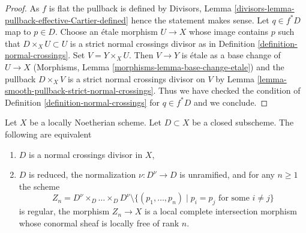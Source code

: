 \begin{proof}
As $f$ is flat the pullback is defined by
Divisors, Lemma \ref{divisors-lemma-pullback-effective-Cartier-defined}
hence the statement makes sense.
Let $q \in f^*D$ map to $p \in D$.
Choose an \'etale morphism $U \to X$ whose image contains $p$
such that $D \times_X U \subset U$ is a strict normal crossings
divisor as in Definition \ref{definition-normal-crossings}.
Set $V = Y \times_X U$. Then $V \to Y$ is \'etale as a base
change of $U \to X$
(Morphisms, Lemma \ref{morphisms-lemma-base-change-etale})
and the pullback $D \times_X V$ is a strict normal crossings
divisor on $V$ by Lemma \ref{lemma-smooth-pullback-strict-normal-crossings}.
Thus we have checked the condition of
Definition \ref{definition-normal-crossings}
for $q \in f^*D$ and we conclude.
\end{proof}

\begin{lemma}
\label{lemma-characterize-normal-crossings-normalization}
Let $X$ be a locally Noetherian scheme. Let $D \subset X$ be a closed
subscheme. The following are equivalent
\begin{enumerate}
\item $D$ is a normal crossings divisor in $X$,
\item $D$ is reduced, the normalization $\nu : D^\nu \to D$ is unramified,
and for any $n \geq 1$ the scheme
$$
Z_n = D^\nu \times_D \ldots \times_D D^\nu
\setminus \{(p_1, \ldots, p_n) \mid p_i = p_j\text{ for some }i\not = j\}
$$
is regular, the morphism $Z_n \to X$ is a local complete intersection
morphism whose conormal sheaf is locally free of rank $n$.
\end{enumerate}
\end{lemma}

